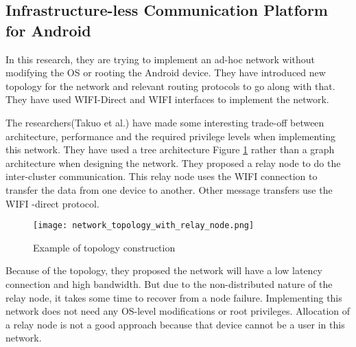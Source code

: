 \vspace{12pt}



\subsection{Infrastructure-less Communication Platform for Android}



\vspace{12pt}

In this research, they are trying to implement an ad-hoc network without modifying the OS or rooting the Android device.  They have introduced new topology for the network and relevant routing protocols to go along with that. They have used WIFI-Direct and WIFI interfaces to implement the network.


\vspace{12pt}

The researchers(Takuo et al.)\cite{wif_direct_with_relay_nodes} have made some interesting trade-off between architecture, performance and the required privilege levels when implementing this network. They have used a tree architecture Figure \ref{fig:topology_construction} rather than a graph architecture when designing the network. They proposed a relay node to do the inter-cluster communication. This relay node uses the WIFI  connection to transfer the data from one device to another. Other message transfers use the WIFI -direct protocol.
\vspace{12pt}

\begin{figure}[H]
    \centering
    \texttt{[image: network\_topology\_with\_relay\_node.png]}
    \caption{Example of topology construction}
    \label{fig:topology_construction}
\end{figure}

\vspace{12pt}
Because of the topology, they proposed the network will have a low latency connection and high bandwidth. But due to the non-distributed nature of the relay node, it takes some time to recover from a node failure. Implementing this network does not need any  OS-level modifications or root privileges. Allocation of a relay node is not a good approach because that device cannot be a user in this network.

\vspace{12pt}
